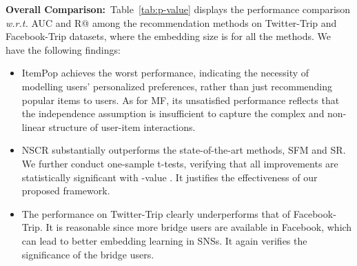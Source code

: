 \documentclass[sigconf]{acmart}
\newcommand{\wrt}{\emph{w.r.t. }}
\begin{document}
	\begin{figure*}[h]
		\centering
{}
		\vspace{-10pt}
		\caption{Performance comparison of AUC and R@ \wrt the embedding size on Twitter-Trip and Facebook-Trip datasets.}
		\vspace{-1em}
		\label{fig:performance-attribute}
	\end{figure*}
	
	\textbf{Overall Comparison:}~Table~\ref{tab:p-value} displays the performance comparison \wrt AUC and R@ among the recommendation methods on Twitter-Trip and Facebook-Trip datasets, where the embedding size is  for all the methods. We have the following findings:
	\begin{itemize}[leftmargin=*]
		\item ItemPop achieves the worst performance, indicating the necessity of modelling users' personalized preferences, rather than just recommending popular items to users. As for MF, its unsatisfied performance reflects that the independence assumption is insufficient to capture the complex and non-linear structure of user-item interactions.
		\item NSCR substantially outperforms the state-of-the-art methods, SFM and SR. We further conduct one-sample t-tests, verifying that all improvements are statistically significant with -value  . It justifies the effectiveness of our proposed framework.
		\item The performance on Twitter-Trip clearly underperforms that of Facebook-Trip. It is reasonable since more bridge users are available in Facebook, which can lead to better embedding learning in SNSs. It again verifies the significance of the bridge users.
	\end{itemize}
	
\end{document}
